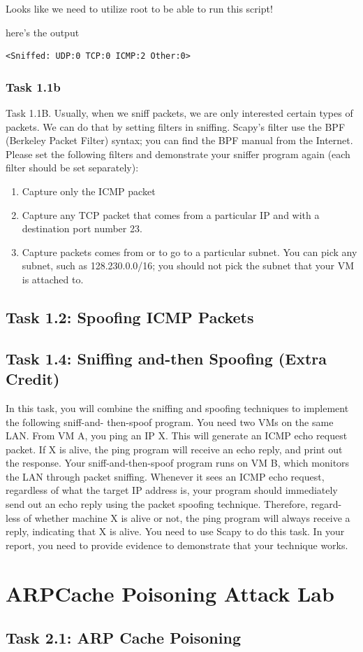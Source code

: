 \documentclass[12pt]{article}
\begin{document}
Looks like we need to utilize root to be able to run this script!

here's the output
\begin{verbatim}
<Sniffed: UDP:0 TCP:0 ICMP:2 Other:0>
\end{verbatim}

\subsubsection{Task 1.1b}
Task 1.1B. Usually, when we sniff packets, we are only interested certain types of packets. We can do
that by setting filters in sniffing. Scapy’s filter use the BPF (Berkeley Packet Filter) syntax; you can find the
BPF manual from the Internet. Please set the following filters and demonstrate your sniffer program again
(each filter should be set separately):
\begin{enumerate}
	\item Capture only the ICMP packet
	\item Capture any TCP packet that comes from a particular IP and with a destination port number 23.
	\item Capture packets comes from or to go to a particular subnet. You can pick any subnet, such as
	128.230.0.0/16; you should not pick the subnet that your VM is attached to.
\end{enumerate}



\subsection{Task 1.2: Spoofing ICMP Packets}
\subsection{Task 1.4: Sniffing and-then Spoofing (Extra Credit)}
In this task, you will combine the sniffing and spoofing techniques to implement the following sniff-and-
then-spoof program. You need two VMs on the same LAN. From VM A, you ping an IP X. This will
generate an ICMP echo request packet. If X is alive, the ping program will receive an echo reply, and
print out the response. Your sniff-and-then-spoof program runs on VM B, which monitors the LAN through
packet sniffing. Whenever it sees an ICMP echo request, regardless of what the target IP address is, your
program should immediately send out an echo reply using the packet spoofing technique. Therefore, regard-
less of whether machine X is alive or not, the ping program will always receive a reply, indicating that X
is alive. You need to use Scapy to do this task. In your report, you need to provide evidence to demonstrate
that your technique works.





\section{ARPCache Poisoning Attack Lab}
\subsection{Task 2.1: ARP Cache Poisoning}
\end{document}
